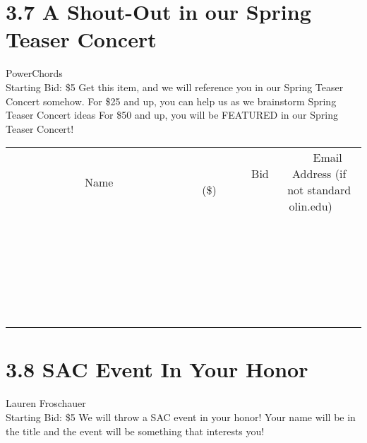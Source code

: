 \documentclass[11pt]{article}
\begin{document}
\section*{3.7 A Shout-Out in our Spring Teaser Concert}
PowerChords
\\
Starting Bid: \$5
\newline
Get this item, and we will reference you in our Spring Teaser Concert somehow.
For \$25 and up, you can help us as we brainstorm Spring Teaser Concert ideas
For \$50 and up, you will be FEATURED in our Spring Teaser Concert!
\\[6ex]
\begin{tabular}{c c c}
~~~~~~~~~~~~~Name~~~~~~~~~~~~~ & ~~~~~~~~~Bid (\$)~~~~~~~~~  & ~~~Email Address (if not standard olin.edu)~~~\\
 & & \\
\hline
 & & \\
\hline
 & & \\
\hline
 & & \\
\hline
 & & \\
\hline
 & & \\
\hline
 & & \\
\hline
 & & \\
\hline
 & & \\
\hline
 & & \\
\hline
 & & \\
\hline
 & & \\
\hline
 & & \\
\hline
 & & \\
\hline
 & & \\
\hline
 & & \\
\hline
 & & \\
\hline
 & & \\
\hline
 & & \\
\hline
 & & \\
\hline
 & & \\
\hline
 & & \\
\hline
 & & \\
\hline
 & & \\
\hline
 & & \\
\hline
 & & \\
\hline
\end{tabular}
\newpage
\section*{3.8 SAC Event In Your Honor}
Lauren Froschauer
\\
Starting Bid: \$5
\newline
We will throw a SAC event in your honor! Your name will be in the title and the event will be something that interests you!
\end{document}
